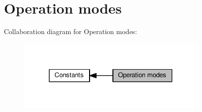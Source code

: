 \hypertarget{group__IL__CONST__OP__MODE}{}\section{Operation modes}
\label{group__IL__CONST__OP__MODE}
Collaboration diagram for Operation modes\+:\nopagebreak
\begin{figure}[H]
\begin{center}
\leavevmode
\includegraphics[width=269pt]{group__IL__CONST__OP__MODE}
\end{center}
\end{figure}
